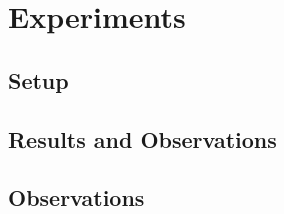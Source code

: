 \section{Experiments}
\label{ch:experiments}



\subsection{Setup}


\subsection{Results and Observations}


\subsection{Observations}

